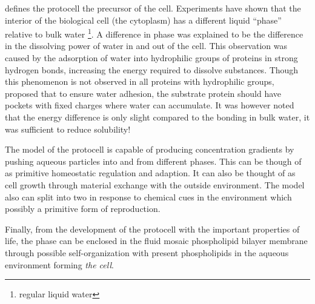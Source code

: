  defines the protocell the precursor of the cell.
Experiments have shown that the interior of the biological cell (the cytoplasm) has a different liquid ``phase'' relative to bulk water \footnote{regular liquid water}.
A difference in phase was explained to be the difference in the dissolving power of water in and out of the cell.
This observation was caused by the adsorption of water into hydrophilic groups of proteins in strong hydrogen bonds, increasing the energy required to dissolve substances.
Though this phenomenon is not observed in all proteins with hydrophilic groups,  proposed that to ensure water adhesion, the substrate protein should have pockets with fixed charges where water can accumulate.
It was however noted that the energy difference is only slight compared to the bonding in bulk water, it was sufficient to reduce solubility!

The model of the protocell is capable of producing concentration gradients by pushing aqueous particles into and from different phases.
This can be though of as primitive homeostatic regulation and adaption.
It can also be thought of as cell growth through material exchange with the outside environment.
The model also can split into two in response to chemical cues in the environment which possibly a primitive form of reproduction.

Finally, from the development of the protocell with the important properties of life, the phase can be enclosed in the fluid mosaic phospholipid bilayer membrane through possible self-organization with present phospholipids in the aqueous environment forming \emph{the cell}.
